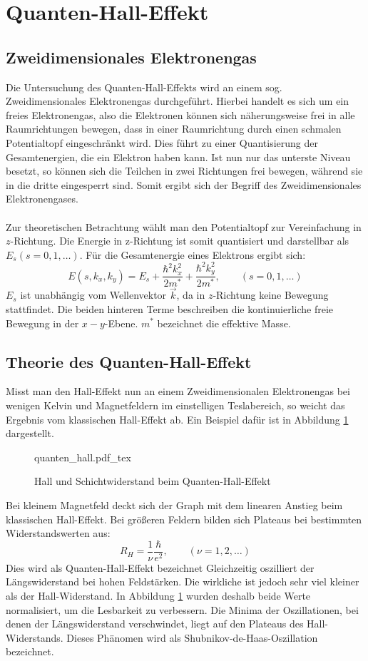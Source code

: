 \section{Quanten-Hall-Effekt}
\subsection{Zweidimensionales Elektronengas}

Die Untersuchung des Quanten-Hall-Effekts wird an einem sog. Zweidimensionales 
Elektronengas durchgeführt. Hierbei handelt es sich um ein freies Elektronengas, 
also die Elektronen können sich näherungsweise frei in alle Raumrichtungen bewegen,
dass in einer Raumrichtung durch einen schmalen Potentialtopf eingeschränkt wird.
Dies führt zu einer Quantisierung der Gesamtenergien, die ein Elektron haben kann.
Ist nun nur das unterste Niveau besetzt, so können sich die Teilchen in zwei 
Richtungen frei bewegen, während sie in die dritte eingesperrt sind. Somit ergibt
sich der Begriff des Zweidimensionales Elektronengases.\\\\
Zur theoretischen Betrachtung wählt man den Potentialtopf zur Vereinfachung in 
$z$-Richtung. Die Energie in z-Richtung ist somit quantisiert und darstellbar als
$E_{s} (s=0,1,\dots)$. Für die Gesamtenergie eines Elektrons ergibt sich:
\[
	E(s,k_{x},k_{y}) = E_{s} + \frac{\hbar^{2} k_{x}^{2}}{2m^{*}}
					   + \frac{\hbar^{2} k_{y}^{2}}{2m^{*}}, \qquad{}
	(s=0,1,\dots)
\]
$E_{s}$ ist unabhängig vom Wellenvektor $\vec{k}$, da in $z$-Richtung keine 
Bewegung stattfindet. Die beiden hinteren Terme beschreiben die kontinuierliche
freie Bewegung in der $x-y$-Ebene. $m^{*}$ bezeichnet die effektive Masse.

\subsection{Theorie des Quanten-Hall-Effekt}

Misst man den Hall-Effekt nun an einem Zweidimensionalen Elektronengas bei wenigen
Kelvin und Magnetfeldern im einstelligen Teslabereich, so weicht das Ergebnis vom
klassischen Hall-Effekt ab. Ein Beispiel dafür ist in Abbildung \ref{Abb:qhe} 
dargestellt.

\begin{figure}[ht]
    \centering
    \def\svgwidth{0.6\linewidth}
    {quanten_hall.pdf_tex}
    \caption{Hall und Schichtwiderstand beim Quanten-Hall-Effekt}
    \label{Abb:qhe}
\end{figure}

Bei kleinem Magnetfeld deckt sich der Graph mit dem linearen Anstieg beim
klassischen Hall-Effekt. Bei größeren Feldern bilden sich Plateaus bei bestimmten 
Widerstandswerten aus:
\[
	R_{H} = \frac{1}{\nu} \frac{\hbar}{e^{2}}, \qquad (\nu=1,2,\dots)
\]
Dies wird als Quanten-Hall-Effekt bezeichnet
Gleichzeitig oszilliert der Längswiderstand bei hohen Feldstärken. Die wirkliche
ist jedoch sehr viel kleiner als der Hall-Widerstand. In Abbildung \ref{Abb:qhe}
wurden deshalb beide Werte normalisiert, um die Lesbarkeit zu verbessern. 
Die Minima der Oszillationen, bei denen der Längswiderstand verschwindet, liegt auf
den Plateaus des Hall-Widerstands. Dieses Phänomen wird als
Shubnikov-de-Haas-Oszillation bezeichnet.
